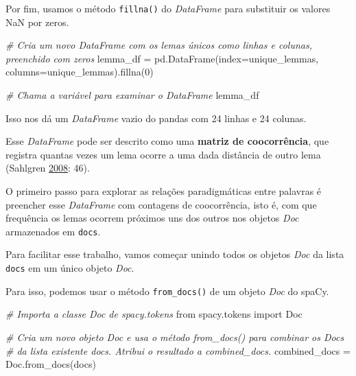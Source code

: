 \documentclass[
  brazilian,
]{article}
\newenvironment{Shaded}{}{}
\newcommand{\CommentTok}[1]{\textcolor[rgb]{0.38,0.63,0.69}{\textit{#1}}}
\newcommand{\DecValTok}[1]{\textcolor[rgb]{0.25,0.63,0.44}{#1}}
\newcommand{\ImportTok}[1]{#1}
\newcommand{\NormalTok}[1]{#1}
\newcommand{\OperatorTok}[1]{\textcolor[rgb]{0.40,0.40,0.40}{#1}}
\begin{document}
Por fim, usamos o método \texttt{fillna()} do \emph{DataFrame} para
substituir os valores NaN por zeros.

\begin{Shaded}
\begin{Highlighting}[]
\CommentTok{\# Cria um novo DataFrame com os lemas únicos como linhas e colunas, preenchido com zeros}
\NormalTok{lemma\_df }\OperatorTok{=}\NormalTok{ pd.DataFrame(index}\OperatorTok{=}\NormalTok{unique\_lemmas, columns}\OperatorTok{=}\NormalTok{unique\_lemmas).fillna(}\DecValTok{0}\NormalTok{)}

\CommentTok{\# Chama a variável para examinar o DataFrame}
\NormalTok{lemma\_df}
\end{Highlighting}
\end{Shaded}

Isso nos dá um \emph{DataFrame} vazio do pandas com 24 linhas e 24
colunas.

Esse \emph{DataFrame} pode ser descrito como uma \textbf{matriz de
coocorrência}, que registra quantas vezes um lema ocorre a uma dada
distância de outro lema (Sahlgren
\href{http://linguistica.sns.it/RdL/20.1/Sahlgren.pdf}{2008}: 46).

O primeiro passo para explorar as relações paradigmáticas entre palavras
é preencher esse \emph{DataFrame} com contagens de coocorrência, isto é,
com que frequência os lemas ocorrem próximos uns dos outros nos objetos
\emph{Doc} armazenados em \texttt{docs}.

Para facilitar esse trabalho, vamos começar unindo todos os objetos
\emph{Doc} da lista \texttt{docs} em um único objeto \emph{Doc}.

Para isso, podemos usar o método \texttt{from\_docs()} de um objeto
\emph{Doc} do spaCy.

\begin{Shaded}
\begin{Highlighting}[]
\CommentTok{\# Importa a classe Doc de spacy.tokens}
\ImportTok{from}\NormalTok{ spacy.tokens }\ImportTok{import}\NormalTok{ Doc}

\CommentTok{\# Cria um novo objeto Doc e usa o método \textquotesingle{}from\_docs()\textquotesingle{} para combinar os Docs}
\CommentTok{\# da lista existente \textquotesingle{}docs\textquotesingle{}. Atribui o resultado a \textquotesingle{}combined\_docs\textquotesingle{}.}
\NormalTok{combined\_docs }\OperatorTok{=}\NormalTok{ Doc.from\_docs(docs)}
\end{Highlighting}
\end{Shaded}
\end{document}
